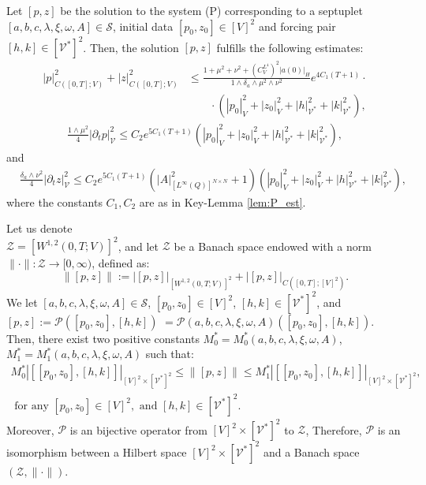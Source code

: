 \documentclass[10pt,a4paper]{amsart}
\def\sP{\mathscr{P}}
\def\sS{\mathscr{S}}
\def\sV{\mathscr{V}}
\def\sZ{\mathscr{Z}}
\begin{document}
\begin{cor}\label{cor:P_est}
  Let $[p,z]$ be the solution to the system (P) corresponding to a septuplet $[a,b,c,\lambda,\xi,\omega,A] \in \sS$, initial data $[p_0,z_0] \in [V]^2$ and forcing pair $[h,k] \in [\sV^*]^2$. Then, the solution $[p,z]$ fulfills the following estimates:
    \begin{align}
      |p|_{C([0,T];V)}^2 + |z|_{C([0,T];V)}^2 &\leq \frac{1 + \mu^2 + \nu^2 + (C_V^{L^4})^2|a(0)|_H}{1 \wedge \delta_a \wedge \mu^2 \wedge \nu^2}e^{4 C_1 (T+1)}\cdot
      \\
      &\qquad \cdot (|p_0|_V^2 + |z_0|_V^2 + |h|_{\sV^*}^2 + |k|_{\sV^*}^2), \label{P_est_97}
    \end{align}
    \begin{gather}
      \frac{1 \wedge \mu^2}{4}|\partial_t p|_{\sV}^2 \leq C_2 e^{5C_1 (T + 1)} (|p_0|_V^2 + |z_0|_V^2 + |h|_{\sV^*}^2 + |k|_{\sV^*}^2), \label{P_TD_est98}
    \end{gather}
    and
    \begin{align}
      &\frac{\delta_a \wedge \nu^2}{4}|\partial_t z|_{\sV}^2 \leq C_2 e^{5 C_1 (T + 1)}(|A|_{[L^\infty(Q)]^{N \times N}}^2 + 1) (|p_0|_V^2 + |z_0|_V^2 + |h|_{\sV^*}^2 + |k|_{\sV^*}^2), \label{P_TD_est99}
    \end{align}
    where the constants $C_1, C_2$ are as in Key-Lemma \ref{lem:P_est}.
\end{cor} 

\begin{cor} \label{cor_bddness}
  Let us denote 
  \\
  $\sZ = [W^{1,2}(0,T;V)]^2$, and let $\sZ$ be a Banach space endowed with a norm $\| \cdot \|: \sZ \longrightarrow [0,\infty)$, defined as:
    \begin{equation}
      \| [p,z] \| := |[p,z]|_{[W^{1,2}(0,T;V)]^2} + |[p,z]|_{C([0,T];[V]^2)}.
    \end{equation}
    We let $[a,b,c,\lambda,\xi,\omega,A] \in \sS$, $[p_0, z_0] \in [V]^2$, $[h,k] \in [\sV^*]^2$, and $[p,z] := \sP([p_0,z_0],[h,k])$ $= \sP(a,b,c,\lambda,\xi,\omega,A)([p_0,z_0],[h,k])$. Then, there exist two positive constants $M_0^* = M_0^*(a,b,c,\lambda,\xi,\omega,A)$, $M_1^* = M_1^*(a,b,c,\lambda,\xi,\omega,A)$ such that:
    \begin{gather}
      M_0^* |[[p_0,z_0],[h,k]]|_{[V]^2 \times [\sV^*]^2} \leq \|[p,z]\| \leq M_1^* |[[p_0,z_0],[h,k]]|_{[V]^2 \times [\sV^*]^2}, 
      \\
      \mbox{ for any } [p_0, z_0] \in [V]^2, \mbox{ and } [h,k] \in [\sV^*]^2. \label{sP_bdd}
    \end{gather}
    Moreover, $\sP$ is an bijective operator from $[V]^2 \times [\sV^*]^2$ to $\sZ$, Therefore, $\sP$ is an isomorphism between a Hilbert space $[V]^2 \times [\sV^*]^2$ and a Banach space $(\sZ, \| \cdot \|)$.
\end{cor}
\end{document}

